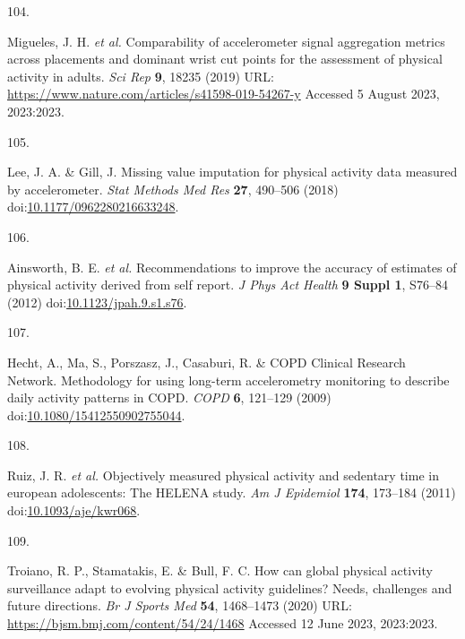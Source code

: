 \documentclass[
  10pt,
]{scrbook}
\newlength{\cslhangindent}
\newlength{\csllabelwidth}
\newlength{\cslentryspacingunit} %
\newenvironment{CSLReferences}[2] %
 {%
  \setlength{\parindent}{0pt}
  \ifodd #1
  \let\oldpar\par
  \def\par{\hangindent=\cslhangindent\oldpar}
  \fi
  \setlength{\parskip}{#2\cslentryspacingunit}
 }%
 {}
\newcommand{\CSLLeftMargin}[1]{\parbox[t]{\csllabelwidth}{#1}}
\newcommand{\CSLRightInline}[1]{\parbox[t]{\linewidth - \csllabelwidth}{#1}\break}
\begin{document}
\begin{CSLReferences}{0}{0}
\leavevmode{}%
\CSLLeftMargin{104. }%
\CSLRightInline{Migueles, J. H. \emph{et al.} Comparability of
accelerometer signal aggregation metrics across placements and dominant
wrist cut points for the assessment of physical activity in adults.
\emph{Sci Rep} \textbf{9}, 18235 (2019) URL:
\url{https://www.nature.com/articles/s41598-019-54267-y} Accessed 5
August 2023, 2023:2023.}

\leavevmode{}%
\CSLLeftMargin{105. }%
\CSLRightInline{Lee, J. A. \& Gill, J. Missing value imputation for
physical activity data measured by accelerometer. \emph{Stat Methods Med
Res} \textbf{27}, 490--506 (2018)
doi:\href{https://doi.org/10.1177/0962280216633248}{10.1177/0962280216633248}.}

\leavevmode{}%
\CSLLeftMargin{106. }%
\CSLRightInline{Ainsworth, B. E. \emph{et al.} Recommendations to
improve the accuracy of estimates of physical activity derived from self
report. \emph{J Phys Act Health} \textbf{9 Suppl 1}, S76--84 (2012)
doi:\href{https://doi.org/10.1123/jpah.9.s1.s76}{10.1123/jpah.9.s1.s76}.}

\leavevmode{}%
\CSLLeftMargin{107. }%
\CSLRightInline{Hecht, A., Ma, S., Porszasz, J., Casaburi, R. \& COPD
Clinical Research Network. Methodology for using long-term accelerometry
monitoring to describe daily activity patterns in {COPD}. \emph{{COPD}}
\textbf{6}, 121--129 (2009)
doi:\href{https://doi.org/10.1080/15412550902755044}{10.1080/15412550902755044}.}

\leavevmode{}%
\CSLLeftMargin{108. }%
\CSLRightInline{Ruiz, J. R. \emph{et al.} Objectively measured physical
activity and sedentary time in european adolescents: The {HELENA} study.
\emph{Am J Epidemiol} \textbf{174}, 173--184 (2011)
doi:\href{https://doi.org/10.1093/aje/kwr068}{10.1093/aje/kwr068}.}

\leavevmode{}%
\CSLLeftMargin{109. }%
\CSLRightInline{Troiano, R. P., Stamatakis, E. \& Bull, F. C. How can
global physical activity surveillance adapt to evolving physical
activity guidelines? Needs, challenges and future directions. \emph{Br J
Sports Med} \textbf{54}, 1468--1473 (2020) URL:
\url{https://bjsm.bmj.com/content/54/24/1468} Accessed 12 June 2023,
2023:2023.}


\end{CSLReferences}
\end{document}
